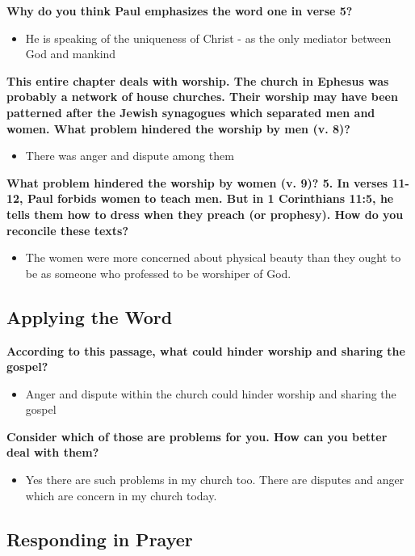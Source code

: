 \documentclass[11pt]{article}
\begin{document}
\textbf{\textbf{Why do you think Paul emphasizes the word one in verse 5?}}
\begin{itemize}
\item He is speaking of the uniqueness of Christ - as the only mediator between God and mankind
\end{itemize}

\textbf{\textbf{This entire chapter deals with worship. The church in Ephesus was probably a network of house churches. Their worship may have been patterned after the Jewish synagogues which separated men and women. What problem hindered the worship by men (v. 8)?}}
\begin{itemize}
\item There was anger and dispute among them
\end{itemize}

\textbf{\textbf{What problem hindered the worship by women (v. 9)? 5. In verses 11-12, Paul forbids women to teach men. But in 1 Corinthians 11:5, he tells them how to dress when they preach (or prophesy). How do you reconcile these texts?}}
\begin{itemize}
\item The women were more concerned about physical beauty than they ought to be as someone who professed to be worshiper of God.
\end{itemize}

\subsection{Applying the Word}
\label{sec:orgc0df1c2}

\textbf{\textbf{According to this passage, what could hinder worship and sharing the gospel?}}
\begin{itemize}
\item Anger and dispute within the church could hinder worship and sharing the gospel
\end{itemize}

\textbf{\textbf{Consider which of those are problems for you. How can you better deal with them?}}
\begin{itemize}
\item Yes there are such problems in my church too. There are disputes and anger which are concern in my church today.
\end{itemize}

\subsection{Responding in Prayer}
\label{sec:org984f98f}
\end{document}
